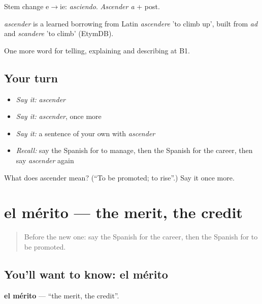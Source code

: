 Stem change e$\to$ie: \emph{asciendo}. \emph{Ascender a} + post.

\begin{cousinweb}
\emph{ascender} is a learned borrowing from Latin \emph{ascendere} 'to climb up', built from \emph{ad} and \emph{scandere} 'to climb' (EtymDB).
\end{cousinweb}

\begin{grammarlens}[title={What you've built}]
One more word for telling, explaining and describing at B1.
\end{grammarlens}

\subsection*{Your turn}
\begin{itemize}
\raggedright
  \item \emph{Say it:} \emph{ascender}
  \item \emph{Say it:} \emph{ascender}, once more
  \item \emph{Say it:} a sentence of your own with \emph{ascender}
  \item \emph{Recall:} say the Spanish for to manage, then the Spanish for the career, then say \emph{ascender} again
\end{itemize}

\begin{tcolorbox}[breakable,colback=teal!4,colframe=teal!35!black,title={Before you move on}]
What does ascender mean? (\textquotedblleft{}To be promoted; to rise\textquotedblright{}.) Say it once more.
\end{tcolorbox}
\section[el mérito]{el mérito — the merit, the credit}

\label{lesson:ES-C595-merito}



\begin{quote}
Before the new one: say the Spanish for the career, then the Spanish for to be promoted.
\end{quote}

\subsection*{You'll want to know: el mérito}
\textbf{el mérito} — \textquotedblleft{}the merit, the credit\textquotedblright{}.

